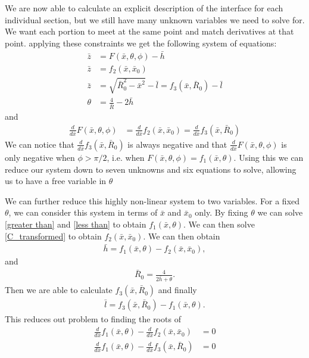 We are now able to calculate an explicit description of the interface for each individual section, but we still have many unknown variables we need to solve for. We want each portion to meet at the same point and match derivatives at that point. applying these constraints we get the following system of equations:
\begin{align}
    \bar{z}&=F(\bar{x},\theta,\phi) - \bar{h} \\
    \bar{z}&=f_2(\bar{x},\bar{x}_0) \\
    \bar{z}&=\sqrt{\bar{R}_0^2-\bar{x}^2} - \bar{l}=f_3(\bar{x},\bar{R}_0)-\bar{l} \\
    \theta&=\frac{4}{\bar{R}}-2\bar{h}
\end{align}
and
\begin{align}
    \frac{d}{d\bar{x}}F(\bar{x},\theta,\phi)&=\frac{d}{d\bar{x}}f_2(\bar{x},\bar{x}_0) = \frac{d}{d\bar{x}}f_3(\bar{x},\bar{R}_0)
\end{align}
We can notice that $\frac{d}{d\bar{x}}f_3(\bar{x},\bar{R}_0)$ is always negative and that $\frac{d}{d\bar{x}}F(\bar{x},\theta,\phi)$ is only negative when $\phi>\pi/2$, i.e. when $F(\bar{x},\theta,\phi)=f_1(\bar{x},\theta)$. Using this we can reduce our system down to seven unknowns and six equations to solve, allowing us to have a free variable in $\theta$

We can further reduce this highly non-linear system to two variables. For a fixed $\theta$, we can consider this system in terms of $\bar{x}$ and $\bar{x}_0$ only. By fixing $\theta$ we can solve \ref{greater than} and \ref{less than} to obtain $f_1(\bar{x},\theta)$. We can then solve \ref{C_transformed} to obtain $f_2(\bar{x},\bar{x}_0)$. We can then obtain
\begin{align}
    \bar{h} = f_1(\bar{x},\theta) - f_2(\bar{x},\bar{x}_0),
\end{align}
and
\begin{align}
    \bar{R}_0=\frac{4}{2\bar{h} + \theta}.
\end{align}
Then we are able to calculate $f_3(\bar{x},\bar{R}_0)$ and finally
\begin{align}
    \bar{l} = f_3(\bar{x},\bar{R}_0)-f_1(\bar{x},\theta).
\end{align}
This reduces out problem to finding the roots of
\begin{align}
    \frac{d}{d\bar{x}}f_1(\bar{x},\theta) -\frac{d}{d\bar{x}}f_2(\bar{x},\bar{x}_0) &=0 \\
    \frac{d}{d\bar{x}}f_1(\bar{x},\theta) - \frac{d}{d\bar{x}}f_3(\bar{x},\bar{R}_0) &=0
\end{align}
